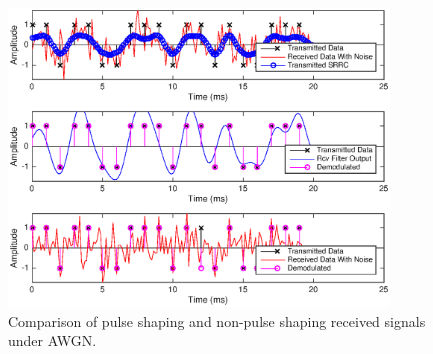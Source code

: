 \documentclass[letterpaper,12pt]{article}
\begin{document}
%
\begin{figure}[!ht]
 \centering
 \includegraphics[width=0.9\textwidth]{filteredEffectsBest.eps}%
\caption{Comparison of pulse shaping and non-pulse shaping received signals under AWGN.}
\label{fig:srrc}
\end{figure} 
%
\end{document}
